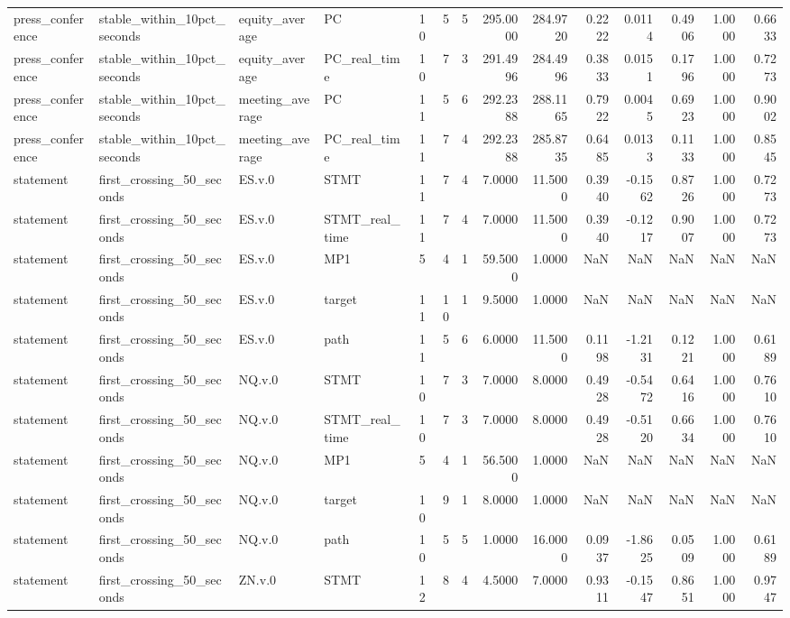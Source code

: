 \begin{tabular}{llllrrrrrrrrrr}
press_conference & stable_within_10pct_seconds & equity_average & PC & 10 & 5 & 5 & 295.0000 & 284.9720 & 0.2222 & 0.0114 & 0.4906 & 1.0000 & 0.6633 \\
press_conference & stable_within_10pct_seconds & equity_average & PC_real_time & 10 & 7 & 3 & 291.4996 & 284.4996 & 0.3833 & 0.0151 & 0.1796 & 1.0000 & 0.7273 \\
press_conference & stable_within_10pct_seconds & meeting_average & PC & 11 & 5 & 6 & 292.2388 & 288.1165 & 0.7922 & 0.0045 & 0.6923 & 1.0000 & 0.9002 \\
press_conference & stable_within_10pct_seconds & meeting_average & PC_real_time & 11 & 7 & 4 & 292.2388 & 285.8735 & 0.6485 & 0.0133 & 0.1133 & 1.0000 & 0.8545 \\
statement & first_crossing_50_seconds & ES.v.0 & STMT & 11 & 7 & 4 & 7.0000 & 11.5000 & 0.3940 & -0.1562 & 0.8726 & 1.0000 & 0.7273 \\
statement & first_crossing_50_seconds & ES.v.0 & STMT_real_time & 11 & 7 & 4 & 7.0000 & 11.5000 & 0.3940 & -0.1217 & 0.9007 & 1.0000 & 0.7273 \\
statement & first_crossing_50_seconds & ES.v.0 & MP1 & 5 & 4 & 1 & 59.5000 & 1.0000 & NaN & NaN & NaN & NaN & NaN \\
statement & first_crossing_50_seconds & ES.v.0 & target & 11 & 10 & 1 & 9.5000 & 1.0000 & NaN & NaN & NaN & NaN & NaN \\
statement & first_crossing_50_seconds & ES.v.0 & path & 11 & 5 & 6 & 6.0000 & 11.5000 & 0.1198 & -1.2131 & 0.1221 & 1.0000 & 0.6189 \\
statement & first_crossing_50_seconds & NQ.v.0 & STMT & 10 & 7 & 3 & 7.0000 & 8.0000 & 0.4928 & -0.5472 & 0.6416 & 1.0000 & 0.7610 \\
statement & first_crossing_50_seconds & NQ.v.0 & STMT_real_time & 10 & 7 & 3 & 7.0000 & 8.0000 & 0.4928 & -0.5120 & 0.6634 & 1.0000 & 0.7610 \\
statement & first_crossing_50_seconds & NQ.v.0 & MP1 & 5 & 4 & 1 & 56.5000 & 1.0000 & NaN & NaN & NaN & NaN & NaN \\
statement & first_crossing_50_seconds & NQ.v.0 & target & 10 & 9 & 1 & 8.0000 & 1.0000 & NaN & NaN & NaN & NaN & NaN \\
statement & first_crossing_50_seconds & NQ.v.0 & path & 10 & 5 & 5 & 1.0000 & 16.0000 & 0.0937 & -1.8625 & 0.0509 & 1.0000 & 0.6189 \\
statement & first_crossing_50_seconds & ZN.v.0 & STMT & 12 & 8 & 4 & 4.5000 & 7.0000 & 0.9311 & -0.1547 & 0.8651 & 1.0000 & 0.9747 \\

\end{tabular}

